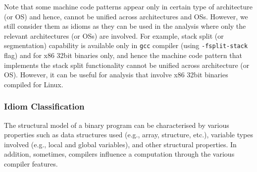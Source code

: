 Note that some machine code patterns appear only in certain type of architecture (or OS) and hence, cannot be unified across architectures and OSs. However, we still consider them as idioms as they can be used in the analysis where only the relevant architectures (or OSs) are involved. For example, stack split (or segmentation) capability is available only in \texttt{gcc} compiler (using \texttt{-fsplit-stack} flag) and for x86 32bit binaries only, and hence the machine code pattern that implements the stack split functionality cannot be unified across architecture (or OS). However, it can be useful for analysis that involve x86 32bit binaries compiled for Linux.




\subsubsection{Idiom Classification} \label{sec:idiom:def}
The structural model of a binary program can be characterised by various properties such as data structures used (e.g., array, structure, etc.),
variable types involved (e.g., local and global variables), %
and other structural properties. In addition, sometimes, compilers influence a computation through the various compiler features. %

